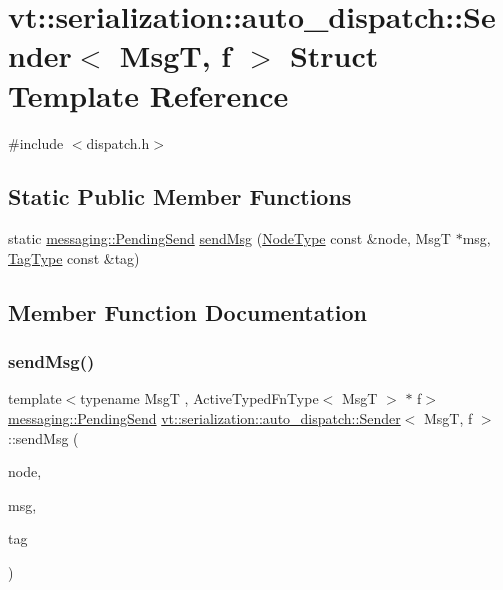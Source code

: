 \hypertarget{structvt_1_1serialization_1_1auto__dispatch_1_1_sender}{}\section{vt\+:\+:serialization\+:\+:auto\+\_\+dispatch\+:\+:Sender$<$ MsgT, f $>$ Struct Template Reference}
\label{structvt_1_1serialization_1_1auto__dispatch_1_1_sender}


{\ttfamily \#include $<$dispatch.\+h$>$}

\subsection*{Static Public Member Functions}
\begin{DoxyCompactItemize}
\item 
static \hyperlink{structvt_1_1messaging_1_1_pending_send}{messaging\+::\+Pending\+Send} \hyperlink{structvt_1_1serialization_1_1auto__dispatch_1_1_sender_aac13b26081adf206c8b325d124aa2e3d}{send\+Msg} (\hyperlink{namespacevt_a866da9d0efc19c0a1ce79e9e492f47e2}{Node\+Type} const \&node, MsgT $\ast$msg, \hyperlink{namespacevt_a84ab281dae04a52a4b243d6bf62d0e52}{Tag\+Type} const \&tag)
\end{DoxyCompactItemize}


\subsection{Member Function Documentation}
\mbox{\label{structvt_1_1serialization_1_1auto__dispatch_1_1_sender_aac13b26081adf206c8b325d124aa2e3d}} 
\subsubsection{\texorpdfstring{send\+Msg()}{sendMsg()}}
{\footnotesize\ttfamily template$<$typename MsgT , Active\+Typed\+Fn\+Type$<$ Msg\+T $>$ $\ast$ f$>$ \\
\hyperlink{structvt_1_1messaging_1_1_pending_send}{messaging\+::\+Pending\+Send} \hyperlink{structvt_1_1serialization_1_1auto__dispatch_1_1_sender}{vt\+::serialization\+::auto\+\_\+dispatch\+::\+Sender}$<$ MsgT, f $>$\+::send\+Msg (\begin{DoxyParamCaption}\item[{\hyperlink{namespacevt_a866da9d0efc19c0a1ce79e9e492f47e2}{Node\+Type} const \&}]{node,  }\item[{MsgT $\ast$}]{msg,  }\item[{\hyperlink{namespacevt_a84ab281dae04a52a4b243d6bf62d0e52}{Tag\+Type} const \&}]{tag }\end{DoxyParamCaption})\hspace{0.3cm}{\ttfamily [static]}}



